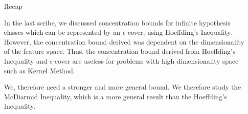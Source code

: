 \documentclass{article}
\begin{document}
\makeheader

\begin{ssection}{Recap}
	
	In the last scribe, we discussed concentration bounds for infinite hypothesis classes which can be represented by an $\epsilon$-cover, using Hoeffding's Inequality. However, the concentration bound derived was dependent on the dimensionality of the feature space. Thus, the concentration bound derived from Hoeffding's Inequality and $\epsilon$-cover are useless for problems with high dimensionality space such as Kernel Method.
	
	We, therefore need a stronger and more general bound. We therefore study the McDiarmid Inequality, which is a more general result than the Hoeffding's Inequality.
	
\end{ssection}
\end{document}
